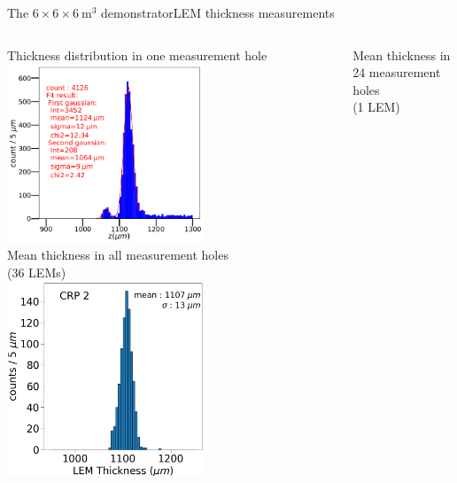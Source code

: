 \documentclass[10pt]{beamer}
\begin{document}
    \begin{frame}{The \texorpdfstring{$6 \times 6 \times \SI{6}{\meter\cubed}$}{666} demonstrator}{LEM thickness measurements}
    	\begin{scriptsize}
    		\begin{columns}
    			\begin{column}{0.48\textwidth}
    				\centering
    				Thickness distribution in one measurement hole\\
    				
    				 \includegraphics[width=0.6\textwidth]{figures/666/distri_1_trou_lem.png}\\
    				\vfill
    				\centering
    				Mean thickness in all measurement holes \\(36 LEMs)\\
    				
    				\includegraphics[width=0.6\textwidth]{figures/666/LEM_sum_all_histo_CERN.png}
    			\end{column}
    			\hfill
    			\begin{column}{0.48\textwidth}
    				\centering
    				Mean thickness in 24 measurement holes\\(1 LEM)\\
    				

\end{column}
\end{columns}
\end{scriptsize}
\end{frame}
\end{document}
